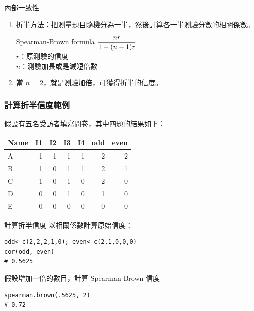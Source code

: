 \documentclass[xcolor=dvipsnames, 13pt]{beamer}
\begin{document}
\begin{frame}{內部一致性}
\begin{enumerate}
\item 折半方法：把測量題目隨機分為一半，然後計算各一半測驗分數的相關係數。
\begin{block}{Spearman-Brown formula}
$\mathlarger{\frac{nr}{1+(n-1)r}}$ \\
$r$：原測驗的信度 \\
$n$：測驗加長或是減短倍數 
\end{block}
\item 當 $n$ = 2，就是測驗加倍，可獲得折半的信度。
\end{enumerate}
\end{frame}

\begin{frame}\frametitle{計算折半信度範例}
假設有五名受訪者填寫問卷，其中四題的結果如下：
\begin{table}
\begin{tabular}{l | r  r  r  r  | r  r}
\hline
Name & I1 & I2 & I3 & I4 & odd & even \\
\hline
A & 1 & 1 & 1 & 1 & 2 & 2 \\
B & 1 & 0 & 1 & 1 & 2 & 1 \\
C & 1 & 0 & 1 & 0 & 2 & 0 \\
D & 0 & 0 & 1 & 0 & 1 & 0 \\
E & 0 & 0 & 0 & 0 & 0 & 0 \\
\hline
\end{tabular}
\end{table}
\end{frame}
\begin{frame}[fragile]{計算折半信度}
以相關係數計算原始信度：
\bigskip
\begin{Verbatim}[frame=single,label=\textit{R code}]
odd<-c(2,2,2,1,0); even<-c(2,1,0,0,0)
cor(odd, even)
# 0.5625
\end{Verbatim}
假設增加一倍的數目，計算 Spearman-Brown 信度
\bigskip
\begin{Verbatim}[frame=single,label=\textit{R code}]
spearman.brown(.5625, 2)
# 0.72
\end{Verbatim}
\end{frame}
\end{document}
